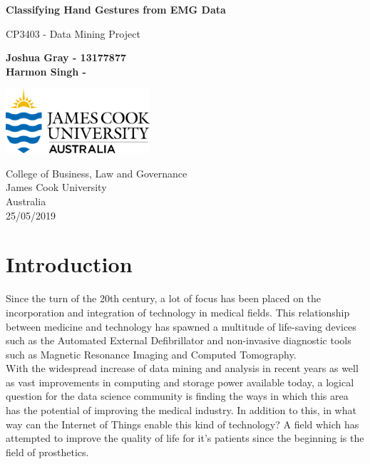 \documentclass[11pt]{article}
\begin{document}
	
	\begin{titlepage}
		\begin{center}
			\vspace*{1cm}
			
			\Huge
			\textbf{Classifying Hand Gestures from EMG Data}
			
			\vspace{0.5cm}
			\LARGE
			CP3403 - Data Mining Project
			
			\vspace{1.5cm}
			
			\textbf{Joshua Gray - 13177877}\\	
			\textbf{Harmon Singh - }
			
			\vfill			
					
			\vspace{0.8cm}
			
			\includegraphics[width=0.4\textwidth]{Figures/jculogo}
			
			\Large
			College of Business, Law and Governance\\
			James Cook University\\
			Australia\\
			25/05/2019
			
		\end{center}
	\end{titlepage}
	
	\tableofcontents
	\listoffigures
	\listoftables
	\newpage
	
	\section{Introduction}
	Since the turn of the 20th century, a lot of focus has been placed on the incorporation and integration of technology in medical fields. This relationship between medicine and technology has spawned a multitude of life-saving devices such as the Automated External Defibrillator and non-invasive diagnostic tools such as Magnetic Resonance Imaging and Computed Tomography.\\
	
	\noindent	
	With the widespread increase of data mining and analysis in recent years as well as vast improvements in computing and storage power available today, a logical question for the data science community is finding the ways in which this area has the potential of improving the medical industry. In addition to this, in what way can the Internet of Things enable this kind of technology? A field which has attempted to improve the quality of life for it's patients since the beginning is the field of prosthetics.\\
	
\end{document}
